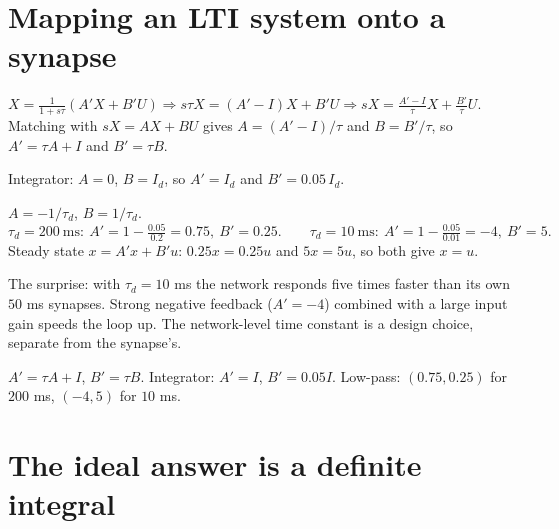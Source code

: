 \documentclass[11pt,letterpaper]{article}
\newcommand{\ans}[1]{\par\vspace{4pt}{\bfseries #1}\quad}
\begin{document}
\section{Mapping an LTI system onto a synapse}

\ans{Q1}
$X = \frac{1}{1 + s\tau}(A'X + B'U) \Rightarrow s\tau X = (A' - I)X + B'U \Rightarrow sX = \frac{A' - I}{\tau}X + \frac{B'}{\tau}U$. Matching with $sX = AX + BU$ gives $A = (A' - I)/\tau$ and $B = B'/\tau$, so $A' = \tau A + I$ and $B' = \tau B$.

Integrator: $A = 0$, $B = I_d$, so $A' = I_d$ and $B' = 0.05\,I_d$.

\ans{Q2}
$A = -1/\tau_d$, $B = 1/\tau_d$.
\[
\tau_d = 200\ \mathrm{ms}: \ A' = 1 - \tfrac{0.05}{0.2} = 0.75,\ B' = 0.25. \qquad
\tau_d = 10\ \mathrm{ms}: \ A' = 1 - \tfrac{0.05}{0.01} = -4,\ B' = 5.
\]
Steady state $x = A'x + B'u$: $0.25x = 0.25u$ and $5x = 5u$, so both give $x = u$.

The surprise: with $\tau_d = 10$ ms the network responds five times faster than its own $50$ ms synapses. Strong negative feedback ($A' = -4$) combined with a large input gain speeds the loop up. The network-level time constant is a design choice, separate from the synapse's.
\begin{center}
\end{center}
\begin{result}
$A' = \tau A + I$, $B' = \tau B$. Integrator: $A' = I$, $B' = 0.05I$. Low-pass: $(0.75, 0.25)$ for $200$ ms, $(-4, 5)$ for $10$ ms.
\end{result}

\section{The ideal answer is a definite integral}
\end{document}
